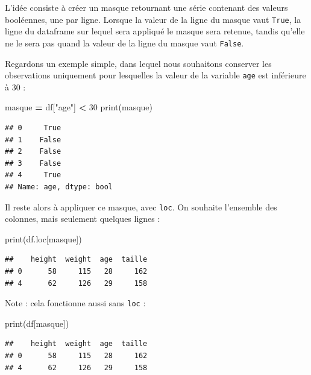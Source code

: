 \documentclass[12pt,]{book}
\newenvironment{Shaded}{\begin{snugshade}}{\end{snugshade}}
\newcommand{\DecValTok}[1]{\textcolor[rgb]{0.00,0.00,0.81}{#1}}
\newcommand{\StringTok}[1]{\textcolor[rgb]{0.31,0.60,0.02}{#1}}
\newcommand{\OperatorTok}[1]{\textcolor[rgb]{0.81,0.36,0.00}{\textbf{#1}}}
\newcommand{\BuiltInTok}[1]{#1}
\newcommand{\NormalTok}[1]{#1}
\numberwithin{equation}{section}
\numberwithin{countremarque}{section}
\begin{document}
L'idée consiste à créer un masque retournant une série contenant des
valeurs booléennes, une par ligne. Lorsque la valeur de la ligne du
masque vaut \texttt{True}, la ligne du dataframe sur lequel sera
appliqué le masque sera retenue, tandis qu'elle ne le sera pas quand la
valeur de la ligne du masque vaut \texttt{False}.

Regardons un exemple simple, dans lequel nous souhaitons conserver les
observations uniquement pour lesquelles la valeur de la variable
\texttt{age} est inférieure à 30 :

\begin{Shaded}
\begin{Highlighting}[]
\NormalTok{masque }\OperatorTok{=}\NormalTok{ df[}\StringTok{"age"}\NormalTok{] }\OperatorTok{<} \DecValTok{30}
\BuiltInTok{print}\NormalTok{(masque)}
\end{Highlighting}
\end{Shaded}

\begin{lstlisting}
## 0     True
## 1    False
## 2    False
## 3    False
## 4     True
## Name: age, dtype: bool
\end{lstlisting}

Il reste alors à appliquer ce masque, avec \texttt{loc}. On souhaite
l'ensemble des colonnes, mais seulement quelques lignes :

\begin{Shaded}
\begin{Highlighting}[]
\BuiltInTok{print}\NormalTok{(df.loc[masque])}
\end{Highlighting}
\end{Shaded}

\begin{lstlisting}
##    height  weight  age  taille
## 0      58     115   28     162
## 4      62     126   29     158
\end{lstlisting}

Note : cela fonctionne aussi sans \texttt{loc} :

\begin{Shaded}
\begin{Highlighting}[]
\BuiltInTok{print}\NormalTok{(df[masque])}
\end{Highlighting}
\end{Shaded}

\begin{lstlisting}
##    height  weight  age  taille
## 0      58     115   28     162
## 4      62     126   29     158
\end{lstlisting}
\end{document}
